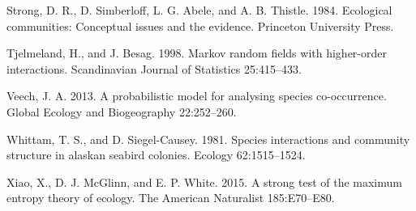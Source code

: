 \documentclass[12pt,]{article}
\begin{document}
\begin{spacing}{1.9}
\begin{flushleft}
Strong, D. R., D. Simberloff, L. G. Abele, and A. B. Thistle. 1984.
Ecological communities: Conceptual issues and the evidence. Princeton
University Press.

Tjelmeland, H., and J. Besag. 1998. Markov random fields with
higher-order interactions. Scandinavian Journal of Statistics
25:415--433.

Veech, J. A. 2013. A probabilistic model for analysing species
co-occurrence. Global Ecology and Biogeography 22:252--260.

Whittam, T. S., and D. Siegel-Causey. 1981. Species interactions and
community structure in alaskan seabird colonies. Ecology 62:1515--1524.

Xiao, X., D. J. McGlinn, and E. P. White. 2015. A strong test of the
maximum entropy theory of ecology. The American Naturalist 185:E70--E80.
\end{flushleft}
\end{spacing}
\end{document}
